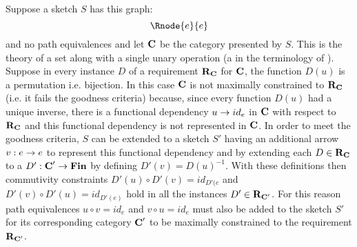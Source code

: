 Suppose a sketch $S$ has  this graph:
$$
\Rnode{e}{e}
$$
and no path equivalences and let $\textbf{C}$ be the category presented by $S$. This is the theory of a
set along with a single unary operation (a  in the terminology of \cite{BarrandWells}). 
Suppose in every instance $D$ of a requirement $\textbf{R}_{\textbf{C}}$ for $\textbf{C}$, the function $D(u)$ is a permutation i.e. bijection. 
In this case  
$\textbf{C}$ is not maximally constrained to $\textbf{R}_{\textbf{C}}$ (i.e. it fails the goodness criteria) because, since every function $D(u)$ had a unique inverse, there is a functional dependency 
$u \rightarrow id_e$ in  $\textbf{C}$ with respect to $\textbf{R}_{\textbf{C}}$ and this functional dependency is not represented in $\textbf{C}$. 
In order to meet the goodness criteria, $S$ can be extended to a sketch $S'$ having an additional arrow $v:e \rightarrow e$ to represent this functional
dependency and by extending each $D \in \textbf{R}_{\textbf{C}}$ to a $D': \textbf{C}' \rightarrow \textbf{Fin}$ by defining $D'(v)=D(u)^{-1}$.
With these definitions then commutivity constraints $D'(u) \circ D'(v)=id_{D'(e}$ and $D'(v) \circ D'(u)=id_{D'(e)}$ hold
in all the instances $D' \in \textbf{R}_{\textbf{C}'}$. For this reason path equivalences $u \circ v=id_e$ and $v \circ u =id_e$
must also be added to the sketch $S'$ for its corresponding category $\textbf{C}'$  to be maximally constrained to the
requirement $\textbf{R}_{\textbf{C}'}$.
